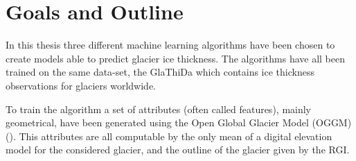%
%


\section{Goals and Outline}\label{goals}
In this thesis three different machine learning algorithms have been chosen to  create models able to predict glacier ice thickness. The algorithms have all been trained on the same data-set, the GlaThiDa which contains ice thickness observations for glaciers worldwide.

To train the algorithm a set of attributes (often called features), mainly geometrical, have been generated using the Open Global Glacier Model (OGGM) (\citet{OGGM2019}). This attributes are all computable by the only mean of a digital elevation model for the considered glacier, and the outline of the glacier given by the RGI.

